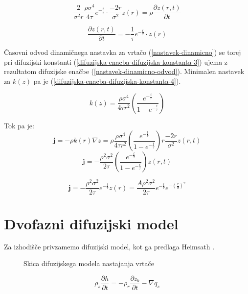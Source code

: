\documentclass[a4paper, oneside, 12pt]{book}
\begin{document}
\[
  \frac{2}{\sigma^2 r} \frac{\rho \sigma^4}{4 \tau} e^{-\frac{t}{\tau}} \cdot \frac{-2r}{\sigma^2} z(r) = \rho \frac{\partial z(r,t)}{\partial t}
\]

\begin{equation}
  \frac{\partial z(r,t)}{\partial t} = - \frac{1}{\tau} e^{-\frac{t}{\tau}} \cdot z(r)
  \label{nastavek-dinamicno-odvod}
\end{equation}

Časovni odvod dinamičnega nastavka za vrtačo (\ref{nastavek-dinamicno}) se torej pri difuzijski konstanti (\ref{difuzijska-enacba-difuzijska-konstanta-3}) ujema z rezultatom difuzijske enačbe (\ref{nastavek-dinamicno-odvod}). Minimalen nastavek za $k(z)$ pa je (\ref{difuzijska-enacba-difuzijska-konstanta-4}).

\begin{equation}
  k(z) = \frac{\rho \sigma^4}{4 \tau r^2} \left( \frac{e^{-\frac{t}{\tau}}}{1-e^{-\frac{t}{\tau}}} \right)
  \label{difuzijska-enacba-difuzijska-konstanta-4}
\end{equation}

Tok pa je:
\[
  \mathbf{j} = - \rho k(r) \nabla z = \rho \frac{\rho \sigma^4}{4 \tau r^2} \left( \frac{e^{-\frac{t}{\tau}}}{1-e^{-\frac{t}{\tau}}} \right) r \frac{-2 r}{\sigma^2} z(r,t)
\]
\[
  \mathbf{j} = - \frac{\rho^2 \sigma^2}{2 \tau} \left( \frac{e^{-\frac{t}{\tau}}}{1-e^{-\frac{t}{\tau}}} \right) z(r,t)
\]

\begin{equation}
  \mathbf{j} = - \frac{\rho^2 \sigma^2}{2 \tau} e^{-\frac{t}{\tau}} z(r) = \frac{A \rho^2 \sigma^2}{2 \tau} e^{-\frac{t}{\tau}} e^{-(\frac{r}{\sigma})^2}
  \label{difuzijska-enacba-tok-2}
\end{equation}

\newpage

\section{Dvofazni difuzijski model}

Za izhodišče privzamemo difuzijski model, kot ga predlaga Heimsath \cite{Heimsath2001}.

\begin{figure}[H]
  \centering
  
  \caption{Skica difuzijskega modela nastajanja vrtače}
  \label{fig:difuzijski-model}
\end{figure}

\begin{equation}
  \rho_s \frac{\partial h}{\partial t} = -\rho_r \frac{\partial z_b}{\partial t} - \nabla q_s
  \label{kontinuitetna-enacba-original}
\end{equation}
\end{document}
